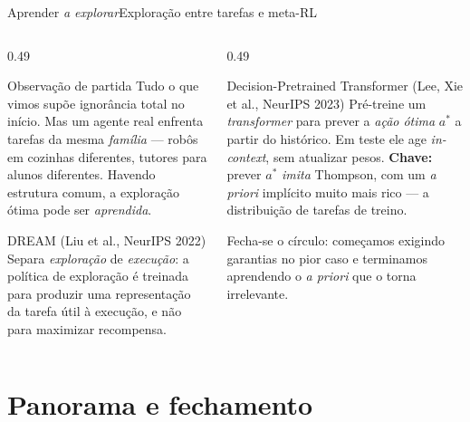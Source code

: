 \documentclass[aspectratio=169, 11pt]{beamer}
\begin{document}
\begin{frame}{Aprender \emph{a explorar}}{Exploração entre tarefas e meta-RL}
  \begin{columns}[T]
    \begin{column}{0.49\textwidth}
      \begin{defbox}{Observação de partida}
        Tudo o que vimos supõe \alert{ignorância total} no início. Mas um agente real
        enfrenta tarefas da mesma \emph{família} --- robôs em cozinhas diferentes,
        tutores para alunos diferentes. Havendo estrutura comum, a exploração ótima pode
        ser \emph{aprendida}.
      \end{defbox}
      \begin{teobox}{DREAM (Liu et al., NeurIPS 2022)}
        Separa \emph{exploração} de \emph{execução}: a política de exploração é treinada
        para produzir uma representação da tarefa útil à execução, e não para maximizar
        recompensa.
      \end{teobox}
    \end{column}
    \begin{column}{0.49\textwidth}
      \begin{teobox}{Decision-Pretrained Transformer (Lee, Xie et al., NeurIPS 2023)}
        Pré-treine um \textit{transformer} para prever a \emph{ação ótima} $a^{*}$ a
        partir do histórico. Em teste ele age \textit{in-context}, sem atualizar pesos.
        \textbf{Chave:} prever $a^{*}$ \emph{imita} Thompson, com um \textit{a priori}
        implícito muito mais rico --- a distribuição de tarefas de treino.
      \end{teobox}
      \begin{ideiabox}
        Fecha-se o círculo: começamos exigindo garantias no pior caso e terminamos
        aprendendo o \textit{a priori} que o torna irrelevante.
      \end{ideiabox}
    \end{column}
  \end{columns}
\end{frame}

\section{Panorama e fechamento}
\end{document}

